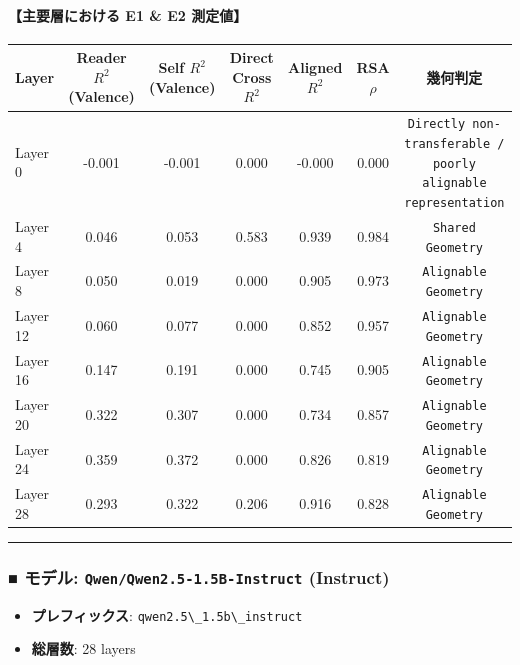 \paragraph{【主要層における E1 \& E2 測定値】}
\begin{center}
\small
\begin{tabular}{lcccccc}
\toprule
\textbf{Layer} & \textbf{Reader $R^2$ (Valence)} & \textbf{Self $R^2$ (Valence)} & \textbf{Direct Cross $R^2$} & \textbf{Aligned $R^2$} & \textbf{RSA $\rho$} & \textbf{幾何判定} \\
\midrule
Layer  0 & -0.001 & -0.001 & 0.000 & -0.000 & 0.000 & \texttt{Directly non-transferable / poorly alignable representation} \\
Layer  4 & 0.046 & 0.053 & 0.583 & 0.939 & 0.984 & \texttt{Shared Geometry} \\
Layer  8 & 0.050 & 0.019 & 0.000 & 0.905 & 0.973 & \texttt{Alignable Geometry} \\
Layer 12 & 0.060 & 0.077 & 0.000 & 0.852 & 0.957 & \texttt{Alignable Geometry} \\
Layer 16 & 0.147 & 0.191 & 0.000 & 0.745 & 0.905 & \texttt{Alignable Geometry} \\
Layer 20 & 0.322 & 0.307 & 0.000 & 0.734 & 0.857 & \texttt{Alignable Geometry} \\
Layer 24 & 0.359 & 0.372 & 0.000 & 0.826 & 0.819 & \texttt{Alignable Geometry} \\
Layer 28 & 0.293 & 0.322 & 0.206 & 0.916 & 0.828 & \texttt{Alignable Geometry} \\
\bottomrule
\end{tabular}
\end{center}



\vspace{0.5em}\hrule\vspace{0.5em}

\subsubsection{■ モデル: \texttt{Qwen/Qwen2.5-1.5B-Instruct} (Instruct)}
\begin{itemize}
\item \textbf{プレフィックス}: \texttt{qwen2.5\textbackslash{}\_1.5b\textbackslash{}\_instruct}
\item \textbf{総層数}: 28 layers
\end{itemize}

